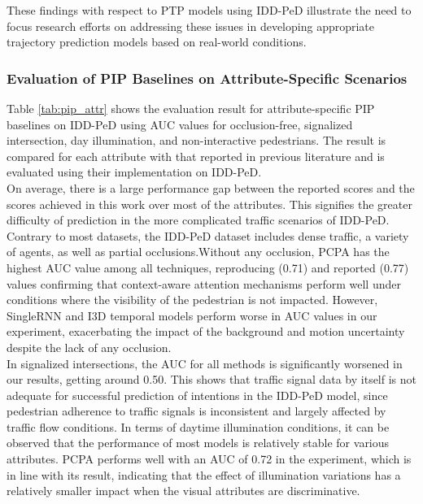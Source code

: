 \documentclass[12pt, a4paper]{article}
\begin{document}
These findings with respect to PTP models using IDD-PeD illustrate the need to focus research efforts on addressing these issues in developing appropriate trajectory prediction models based on real-world conditions.

\subsubsection{Evaluation of PIP Baselines on Attribute-Specific Scenarios}
Table \ref{tab:pip_attr} shows the evaluation result for attribute-specific PIP baselines on IDD-PeD using AUC values for occlusion-free, signalized intersection, day illumination, and non-interactive pedestrians. The result is compared for each attribute with that reported in previous literature and is evaluated using their implementation on IDD-PeD.\\

On average, there is a large performance gap between the reported scores and the scores achieved in this work over most of the attributes. This signifies the greater difficulty of prediction in the more complicated traffic scenarios of IDD-PeD. Contrary to most datasets, the IDD-PeD dataset includes dense traffic, a variety of agents, as well as partial occlusions.Without any occlusion, PCPA \cite{rasouli2019pie} has the highest AUC value among all techniques, reproducing (0.71) and reported (0.77) values confirming that context-aware attention mechanisms perform well under conditions where the visibility of the pedestrian is not impacted. However, SingleRNN and I3D temporal models perform worse in AUC values in our experiment, exacerbating the impact of the background and motion uncertainty despite the lack of any occlusion.\\

In signalized intersections, the AUC for all methods is significantly worsened in our results, getting around 0.50. This shows that traffic signal data by itself is not adequate for successful prediction of intentions in the IDD-PeD model, since pedestrian adherence to traffic signals is inconsistent and largely affected by traffic flow conditions. In terms of daytime illumination conditions, it can be observed that the performance of most models is relatively stable for various attributes. PCPA performs well with an AUC of 0.72 in the experiment, which is in line with its result, indicating that the effect of illumination variations has a relatively smaller impact when the visual attributes are discriminative.\\
\end{document}
